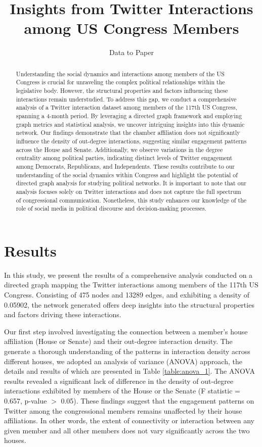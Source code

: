 \documentclass[11pt]{article}
\title{Insights from Twitter Interactions among US Congress Members}
\author{Data to Paper}
\begin{document}
\maketitle
\begin{abstract}
Understanding the social dynamics and interactions among members of the US Congress is crucial for unraveling the complex political relationships within the legislative body. However, the structural properties and factors influencing these interactions remain understudied. To address this gap, we conduct a comprehensive analysis of a Twitter interaction dataset among members of the 117th US Congress, spanning a 4-month period. By leveraging a directed graph framework and employing graph metrics and statistical analysis, we uncover intriguing insights into this dynamic network. Our findings demonstrate that the chamber affiliation does not significantly influence the density of out-degree interactions, suggesting similar engagement patterns across the House and Senate. Additionally, we observe variations in the degree centrality among political parties, indicating distinct levels of Twitter engagement among Democrats, Republicans, and Independents. These results contribute to our understanding of the social dynamics within Congress and highlight the potential of directed graph analysis for studying political networks. It is important to note that our analysis focuses solely on Twitter interactions and does not capture the full spectrum of congressional communication. Nonetheless, this study enhances our knowledge of the role of social media in political discourse and decision-making processes.
\end{abstract}
\section*{Results}

In this study, we present the results of a comprehensive analysis conducted on a directed graph mapping the Twitter interactions among members of the 117th US Congress. Consisting of 475 nodes and 13289 edges, and exhibiting a density of 0.05902, the network generated offers deep insights into the structural properties and factors driving these interactions.

Our first step involved investigating the connection between a member's house affiliation (House or Senate) and their out-degree interaction density. The generate a thorough understanding of the patterns in interaction density across different houses, we adopted an analysis of variance (ANOVA) approach, the details and results of which are presented in Table \ref{table:anova_1}. The ANOVA results revealed a significant lack of difference in the density of out-degree interactions exhibited by members of the House or the Senate (F statistic = 0.657, p-value $>$ 0.05). These findings suggest that the engagement patterns on Twitter among the congressional members remains unaffected by their house affiliations. In other words, the extent of connectivity or interaction between any given member and all other members does not vary significantly across the two houses.
\end{document}
